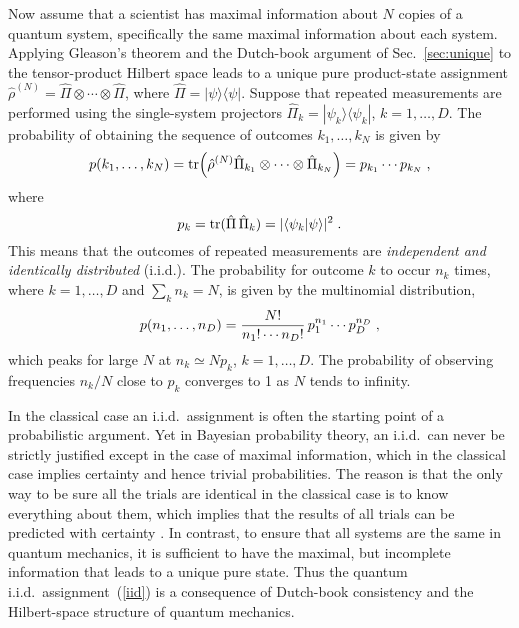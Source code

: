 Now assume that a scientist has maximal information about $N$
copies of a quantum system, specifically the same maximal information
about each system.  Applying Gleason's theorem and the Dutch-book
argument of Sec.~\ref{sec:unique} to the tensor-product Hilbert space
leads to a unique pure product-state assignment
$\hat\rho^{(N)}=\hat\Pi\otimes\cdots\otimes\hat\Pi$, where
$\hat\Pi=|\psi\rangle\langle\psi|$. Suppose that repeated
measurements are performed using the single-system projectors
$\hat\Pi_k=|\psi_k\rangle\langle\psi_k|$, $k=1,\ldots,D$. The
probability of obtaining the sequence of outcomes $k_1,\ldots,k_N$ is
given by
\begin{equation}
p(k_1,\ldots,k_N)=
{\rm tr}
\Bigl(\hat\rho^{(N)}\hat\Pi_{k_1}\otimes\cdots\otimes\hat\Pi_{k_N}\Bigr)=
p_{k_1}\cdots p_{k_N}\;,
\label{eq:pk}
\end{equation}
where
\begin{equation}
p_k={\rm tr}(\hat\Pi\,\hat\Pi_k)=|\langle\psi_k|\psi\rangle|^2\;.
\end{equation}
This means that the outcomes of repeated measurements are {\it
independent and identically distributed\/} (i.i.d.).  The probability
for outcome $k$ to occur $n_k$ times, where $k=1,\ldots,D$ and
$\sum_k n_k=N$, is given by the multinomial distribution,
\begin{equation}
\label{iid}
p(n_1,\ldots,n_D)={N!\over n_1!\cdots n_D!}\,p_1^{n_1}\cdots p_D^{n_D}\;,
\end{equation}
which peaks for large $N$ at $n_k\simeq Np_k$, $k=1,\ldots,D$.  The
probability of observing frequencies $n_k/N$ close to $p_k$ converges
to 1 as $N$ tends to infinity.

In the classical case an i.i.d.\ assignment is often the starting
point of a probabilistic argument.  Yet in Bayesian probability
theory, an i.i.d.\ can never be strictly justified except in the case
of maximal information, which in the classical case implies certainty
and hence trivial probabilities.  The reason is that the only way to
be sure all the trials are identical in the classical case is to know
everything about them, which implies that the results of all trials
can be predicted with certainty \cite{Jaynespost}.   In contrast, to
ensure that all systems are the same in quantum mechanics, it is
sufficient to have the maximal, but incomplete information that leads
to a unique pure state.  Thus the quantum i.i.d.\
assignment~(\ref{iid}) is a consequence of Dutch-book consistency and
the Hilbert-space structure of quantum mechanics.

